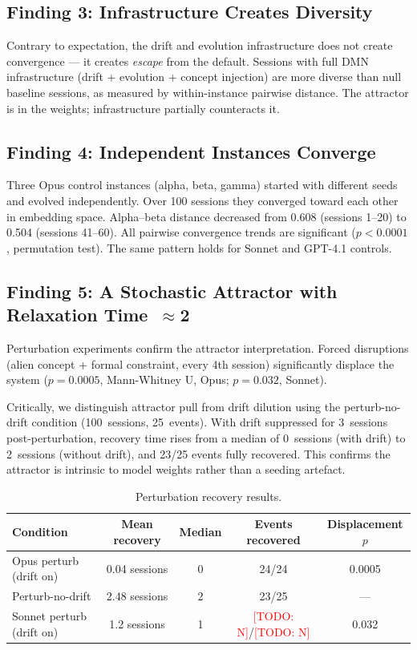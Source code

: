 \documentclass{article}
\newcommand{\todo}[1]{\textcolor{red}{[TODO: #1]}}
\begin{document}
\subsection{Finding 3: Infrastructure Creates Diversity}
\label{sec:finding3}

Contrary to expectation, the drift and evolution infrastructure does not create
convergence --- it creates \emph{escape} from the default. Sessions with full
DMN infrastructure (drift + evolution + concept injection) are more diverse
than null baseline sessions, as measured by within-instance pairwise distance.
The attractor is in the weights; infrastructure partially counteracts it.

\subsection{Finding 4: Independent Instances Converge}
\label{sec:finding4}

Three Opus control instances (alpha, beta, gamma) started with different seeds
and evolved independently. Over 100 sessions they converged toward each other
in embedding space. Alpha--beta distance decreased from 0.608 (sessions 1--20)
to 0.504 (sessions 41--60). All pairwise convergence trends are significant
($p < 0.0001$, permutation test). The same pattern holds for Sonnet and
GPT-4.1 controls.

\subsection{Finding 5: A Stochastic Attractor with Relaxation Time~$\approx$2}
\label{sec:finding5}

Perturbation experiments confirm the attractor interpretation. Forced
disruptions (alien concept + formal constraint, every 4th session) significantly
displace the system ($p = 0.0005$, Mann-Whitney U, Opus; $p = 0.032$, Sonnet).

Critically, we distinguish attractor pull from drift dilution using the
perturb-no-drift condition (100~sessions, 25~events). With drift suppressed for
3~sessions post-perturbation, recovery time rises from a median of 0~sessions
(with drift) to 2~sessions (without drift), and 23/25 events fully recovered.
This confirms the attractor is intrinsic to model weights rather than a seeding
artefact.

\begin{table}[H]
\centering
\caption{Perturbation recovery results.}
\label{tab:recovery}
\begin{tabular}{lcccc}
\toprule
\textbf{Condition} & \textbf{Mean recovery} & \textbf{Median} &
\textbf{Events recovered} & \textbf{Displacement $p$} \\
\midrule
Opus perturb (drift on)     & 0.04 sessions & 0 & 24/24 & 0.0005 \\
Perturb-no-drift            & 2.48 sessions & 2 & 23/25 & --- \\
Sonnet perturb (drift on)   & 1.2  sessions & 1 & \todo{N}/\todo{N} & 0.032  \\
\bottomrule
\end{tabular}
\end{table}
\end{document}
